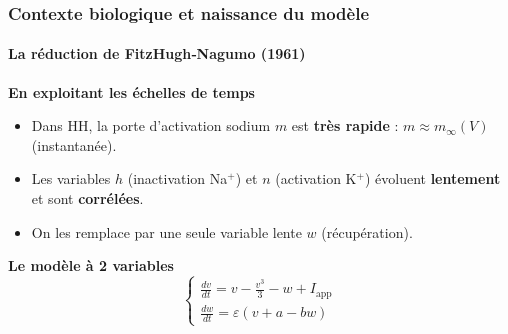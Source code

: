\begin{frame}
\frametitle{Contexte biologique et naissance du modèle}
\framesubtitle{La réduction de FitzHugh‑Nagumo (1961)}
\alert{\textbf{En exploitant les échelles de temps}}
\begin{itemize}
  \item Dans HH, la porte d’activation sodium $m$ est \textbf{très rapide} : $m \approx m_\infty(V)$ (instantanée).
  \item Les variables $h$ (inactivation Na$^+$) et $n$ (activation K$^+$) évoluent \textbf{lentement} et sont \textbf{corrélées}.
  \item On les remplace par une seule variable lente $w$ (récupération).
\end{itemize}

\alert{\textbf{Le modèle à 2 variables}}
\[
\begin{cases}
  \displaystyle \frac{dv}{dt} = v - \frac{v^3}{3} - w + I_{\text{app}} \\[8pt]
  \displaystyle \frac{dw}{dt} = \varepsilon (v + a - b w)
\end{cases}
\]
\end{frame}